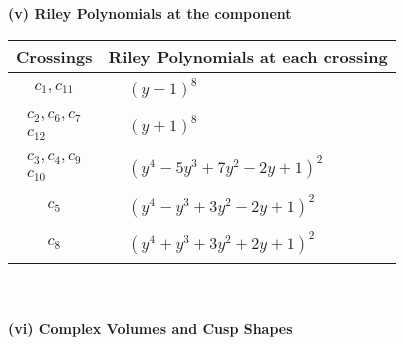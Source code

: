 \documentclass[1p]{elsarticle_modified}
\theoremstyle{definition}
\begin{document}
\newpage\renewcommand{\arraystretch}{1}
\flushleft \textbf{(v) Riley Polynomials at the component}\newline \\
\begin{tabular}{m{50pt}|m{274pt}}
Crossings & \hspace{64pt}Riley Polynomials at each crossing \\
\hline $$\begin{aligned}c_{1},c_{11}\end{aligned}$$&$\begin{aligned}
&(y-1)^8
\end{aligned}$\\
\hline $$\begin{aligned}c_{2},c_{6},c_{7}\\c_{12}\end{aligned}$$&$\begin{aligned}
&(y+1)^8
\end{aligned}$\\
\hline $$\begin{aligned}c_{3},c_{4},c_{9}\\c_{10}\end{aligned}$$&$\begin{aligned}
&(y^4-5 y^3+7 y^2-2 y+1)^2
\end{aligned}$\\
\hline $$\begin{aligned}c_{5}\end{aligned}$$&$\begin{aligned}
&(y^4- y^3+3 y^2-2 y+1)^2
\end{aligned}$\\
\hline $$\begin{aligned}c_{8}\end{aligned}$$&$\begin{aligned}
&(y^4+y^3+3 y^2+2 y+1)^2
\end{aligned}$\\
\hline
\end{tabular}\\~\\
\newpage\flushleft \textbf{(vi) Complex Volumes and Cusp Shapes}
\end{document}
